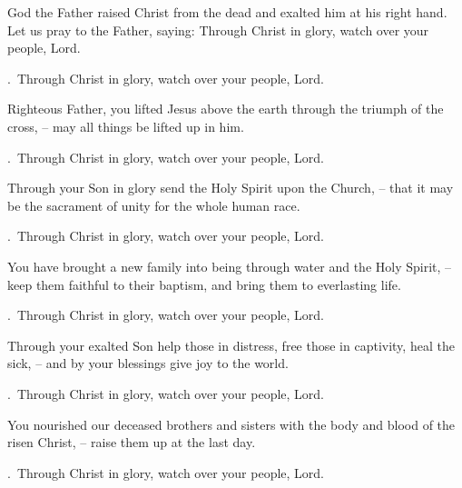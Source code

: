 \lettrine[loversize=0.15,lines=2]{G}{}od the Father raised Christ from the dead and exalted him at his right hand. Let us pray to the Father, saying: Through Christ in glory, watch over your people, Lord.
\par \Rbar.~Through Christ in glory, watch over your people, Lord.

Righteous Father, you lifted Jesus above the earth through the triumph of the cross,
– may all things be lifted up in him.
\par \Rbar.~Through Christ in glory, watch over your people, Lord.

Through your Son in glory send the Holy Spirit upon the Church,
– that it may be the sacrament of unity for the whole human race.
\par \Rbar.~Through Christ in glory, watch over your people, Lord.

You have brought a new family into being through water and the Holy Spirit,
– keep them faithful to their baptism, and bring them to everlasting life.
\par \Rbar.~Through Christ in glory, watch over your people, Lord.

Through your exalted Son help those in distress, free those in captivity, heal the sick,
– and by your blessings give joy to the world.
\par \Rbar.~Through Christ in glory, watch over your people, Lord.

You nourished our deceased brothers and sisters with the body and blood of the risen Christ,
– raise them up at the last day.
\par \Rbar.~Through Christ in glory, watch over your people, Lord.
